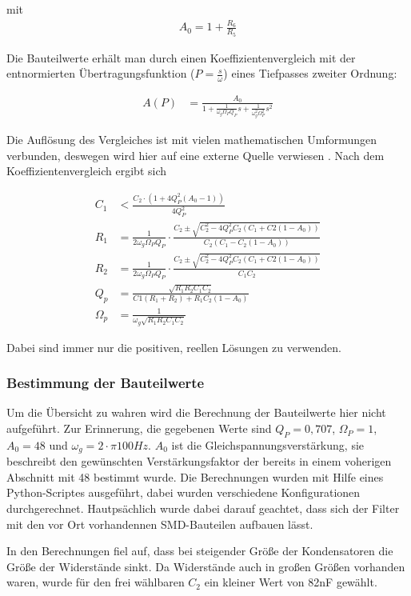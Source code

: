 mit
\begin{align*}
A_0=1+\frac{R_6}{R_5}
\end{align*}


Die Bauteilwerte erhält man durch einen Koeffizientenvergleich mit der entnormierten
Übertragungsfunktion ($P=\frac{s}{\omega}$) eines Tiefpasses zweiter Ordnung:

\begin{align*}
A(P)&=\frac{A_0}{1+\frac{1}{\omega_g\Omega_PQ_P}s+\frac{1}{\omega_g^2\Omega_P^2}s^2}
\end{align*}

Die Auflösung des Vergleiches ist mit vielen mathematischen Umformungen verbunden, deswegen wird hier auf eine
externe Quelle verwiesen \cite[S. 102]{Krucker2000}.
Nach dem Koeffizientenvergleich ergibt sich

\begin{align*}
C_1&<\frac{C_2\cdot(1+4Q^2_P(A_0-1))}{4Q^2_P}\\
R_1&=\frac{1}{2\omega_g\Omega_PQ_P} \cdot \frac{C_2\pm\sqrt{C_2^2-4Q^2_PC_2(C_1+C2(1-A_0))}}{C_2(C_1-C_2(1-A_0))}   \\
R_2&=\frac{1}{2\omega_g\Omega_PQ_P} \cdot \frac{C_2\pm\sqrt{C_2^2-4Q^2_PC_2(C_1+C2(1-A_0))}}{C_1C_2}  \\
Q_p&=\frac{\sqrt{R_1R_2C_1C_2}}{C1(R_1+R_2)+R_1C_2(1-A_0)}\\
\Omega_p&=\frac{1}{\omega_g\sqrt{R_1R_2C_1C_2}}
\end{align*}

Dabei sind immer nur die positiven, reellen Lösungen zu verwenden.


\subsubsection{Bestimmung der Bauteilwerte}

Um die Übersicht zu wahren wird die Berechnung der Bauteilwerte hier nicht aufgeführt. Zur Erinnerung,
die gegebenen Werte sind $Q_P=0,707$, $\Omega_P=1$, $A_0=48$ und $\omega_g = 2 \cdot \pi 100Hz$.
$A_0$ ist die Gleichspannungsverstärkung, sie beschreibt den gewünschten Verstärkungsfaktor der bereits in einem voherigen
Abschnitt mit 48 bestimmt wurde. Die Berechnungen wurden mit Hilfe eines Python-Scriptes ausgeführt, dabei wurden verschiedene
Konfigurationen durchgerechnet. Hautpsächlich wurde dabei darauf geachtet, dass sich der Filter mit den vor Ort vorhandennen SMD-Bauteilen
aufbauen lässt.

In den Berechnungen fiel auf, dass bei steigender Größe der Kondensatoren die Größe der Widerstände sinkt. Da Widerstände auch in großen Größen vorhanden waren,
wurde für den frei wählbaren $C_2$ ein kleiner Wert von 82nF gewählt.

